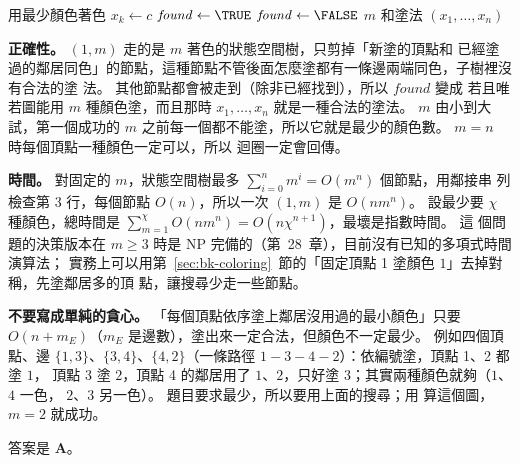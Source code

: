 \begin{pseudo}[unbreakable]{用最少顏色著色}
 
            \State $x_k \gets c$
                \State $\mathit{found} \gets \TRUE$
            \Else
                \State {}
            \EndIf
                \State \Return {}
            \EndIf
        \EndIf
    \EndFor
\EndProcedure
\Statex
{}
        \State $\mathit{found} \gets \FALSE$
        \State {}
            \State \Return $m$ 和塗法 $(x_1, \ldots, x_n)$
        \EndIf
    \EndFor
\EndFunction
\end{pseudo}

\textbf{正確性。} $(1, m)$ 走的是 $m$ 著色的狀態空間樹，只剪掉「新塗的頂點和
已經塗過的鄰居同色」的節點，這種節點不管後面怎麼塗都有一條邊兩端同色，子樹裡沒有合法的塗
法。 其他節點都會被走到（除非已經找到），所以 $\mathit{found}$ 變成 \TRUE{} 若且唯若圖能用
$m$ 種顏色塗，而且那時 $x_1, \ldots, x_n$ 就是一種合法的塗法。 $m$ 由小到大試，第一個成功的
$m$ 之前每一個都不能塗，所以它就是最少的顏色數。 $m = n$ 時每個頂點一種顏色一定可以，所以
迴圈一定會回傳。

\textbf{時間。} 對固定的 $m$，狀態空間樹最多 $\sum_{i=0}^{n} m^i = O(m^n)$ 個節點，用鄰接串
列檢查第 3 行，每個節點 $O(n)$，所以一次 $(1, m)$ 是 $O(n m^n)$。 設最少要
$\chi$ 種顏色，總時間是 $\sum_{m=1}^{\chi} O(n m^n) = O(n \chi^{n+1})$，最壞是指數時間。 這
個問題的決策版本在 $m \ge 3$ 時是 NP 完備的（第~28~章），目前沒有已知的多項式時間演算法；
實務上可以用第~\ref{sec:bk-coloring}~節的「固定頂點 1 塗顏色 $1$」去掉對稱，先塗鄰居多的頂
點，讓搜尋少走一些節點。

\textbf{不要寫成單純的貪心。} 「每個頂點依序塗上鄰居沒用過的最小顏色」只要
$O(n + m_E)$（$m_E$ 是邊數），塗出來一定合法，但顏色不一定最少。 例如四個頂點、邊
$\{1, 3\}$、$\{3, 4\}$、$\{4, 2\}$（一條路徑 $1 - 3 - 4 - 2$）：依編號塗，頂點 1、2 都塗 $1$，
頂點 3 塗 $2$，頂點 4 的鄰居用了 $1$、$2$，只好塗 $3$；其實兩種顏色就夠（$1$、$4$ 一色，
$2$、$3$ 另一色）。 題目要求最少，所以要用上面的搜尋；用  算這個圖，
$m = 2$ 就成功。

答案是 \textbf{A}。


